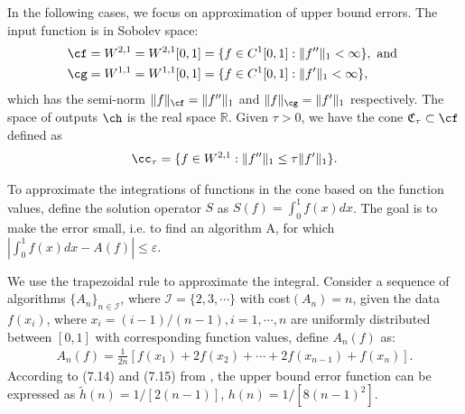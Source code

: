 
\newcommand{\R}{\mathbb{R}}
In the following cases, we focus on approximation of upper bound errors. The input function is in Sobolev space:
\begin{align*}
  \cf&=W^{2,1}=W^{2,1}[0,1]=\{f\in C^1[0,1]: \|f''\|_1<\infty\}, \text{ and }\\
  \cg&=W^{1,1}=W^{1,1}[0,1]=\{f\in C^1[0,1]: \|f'\|_1<\infty\},
\end{align*}
which has the semi-norm $\|f\|_{\cf}=\|f''\|_{1}$ and $\|f\|_{\cg}=\|f'\|_{1}$ respectively. The space of outputs $\ch$ is the real space $\R$. Given $\tau > 0$, we have the cone $\mathfrak{C}_{\tau} \subset \cf$ defined as
\begin{align}\label{coneinteg}
\cc_{\tau}=\{f\in W^{2,1}:\|f''\|_1\leq\tau\|f'\|_1\}.
\end{align}

To approximate the integrations of functions in the cone based on the function values, define the solution operator $S$ as $S(f)=\int_{0}^{1}f(x)dx$. The goal is to make the error small, i.e. to find an algorithm A, for which $|\int_{0}^{1}f(x)dx-A(f)|\leq \varepsilon$.

We use the trapezoidal rule to approximate the integral. Consider a sequence of algorithms $\{A_n\}_{n\in \mathcal{I}}$, where $\mathcal{I}=\{2,3,\cdots\}$ with cost$(A_n)=n$, given the data $f(x_i)$, where $x_i=(i-1)/(n-1), i=1,\cdots,n$ are uniformly distributed between $[0,1]$ with corresponding function values, define $A_n(f)$ as: \begin{align*}
    A_{n}(f)%
    =\frac{1}{2n}[f(x_1)+2f(x_2)+\cdots+2f(x_{n-1})+f(x_n)].
\end{align*}
According to (7.14) and (7.15) from \cite{BraPet}, the upper bound error function can be expressed as $\tilde{h}(n)=1/[2(n-1)]$, $h(n)=1/[8(n-1)^2]$.
%
%
